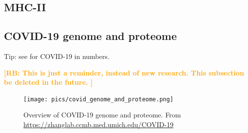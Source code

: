 \documentclass{article}
\newcommand{\richel}[1]{\textcolor{orange}{\textbf{[RB: #1]}}}
\begin{document}
\begin{table}
  
  \caption{
    Kolmogorov-Smirnov test results comparing human and Mycobacterium for MHC-I
    \richel{Done on the simulated data}
  }
  \label{table:bbbq_1_stats_myco}
\end{table}

\subsection{MHC-II}

\begin{table}
  
  \caption{
    Percentage of MHC-II epitopes overlapping with transmembrane helix.
    \richel{This is simulated data}
  }
  \label{table:bbbq_2_percentages}
\end{table}

\begin{table}
  
  \caption{
    Kolmogorov-Smirnov test results comparing human and COVID-19 for MHC-II
    \richel{Done on the simulated data}
  }
  \label{table:bbbq_2_stats_covid}
\end{table}

\begin{table}
  
  \caption{
    Kolmogorov-Smirnov test results comparing human and Mycobacterium for MHC-II
    \richel{Done on the simulated data}
  }
  \label{table:bbbq_2_stats_myco}
\end{table}

\subsection{COVID-19 genome and proteome}

Tip: see \cite{bar2020sars} for COVID-19 in numbers.

\richel{
  This is just a reminder, instead of new research. 
  This subsection be deleted in the future.
}

\begin{figure}[!htbp]
  \texttt{[image: pics/covid\_genome\_and\_proteome.png]}
  \caption{
    Overview of COVID-19 genome and proteome.
    From 
    \url{https://zhanglab.ccmb.med.umich.edu/COVID-19}
  }
  \label{fig:covid_genome_and_proteome}
\end{figure}
\end{document}
